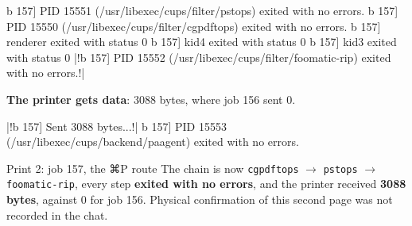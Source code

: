 \documentclass[11pt,a4paper]{article}
\begin{document}
\begin{cmdout}
b 157] PID 15551 (/usr/libexec/cups/filter/pstops) exited with no errors.
b 157] PID 15550 (/usr/libexec/cups/filter/cgpdftops) exited with no errors.
b 157] renderer exited with status 0
b 157] kid4 exited with status 0
b 157] kid3 exited with status 0
|!b 157] PID 15552 (/usr/libexec/cups/filter/foomatic-rip) exited with no errors.!|
\end{cmdout}

\textbf{The printer gets data}: 3088 bytes, where job 156 sent 0.

\begin{cmdout}
|!b 157] Sent 3088 bytes...!|
b 157] PID 15553 (/usr/libexec/cups/backend/paagent) exited with no errors.
\end{cmdout}

\begin{printed}{Print 2: job 157, the ⌘P route}
The chain is now \texttt{cgpdftops} $\to$ \texttt{pstops} $\to$ \texttt{foomatic-rip}, every step \textbf{exited with no errors}, and the printer received \textbf{3088 bytes}, against 0 for job 156. Physical confirmation of this second page was not recorded in the chat.
\end{printed}

\begin{center}
\end{center}
\end{document}
